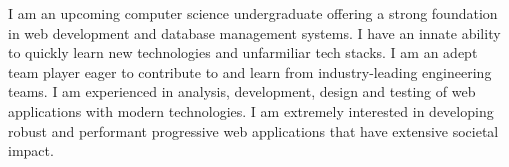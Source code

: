
\begin{cvparagraph}
I am an upcoming computer science undergraduate offering a strong foundation in web development and database management systems. I have an innate ability to quickly learn new technologies
and unfarmiliar tech stacks. I am an adept team player eager to contribute to and learn from industry-leading engineering teams. I am experienced in analysis, development, design and testing
of web applications with modern technologies. I am extremely interested in developing robust and performant progressive web applications that have extensive societal impact.
\end{cvparagraph}
